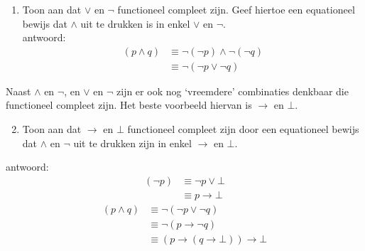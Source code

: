 \begin{answer}\mbox{} %
\begin{enumerate}[label=\textit{\alph*.}]
\item Toon aan dat $\lor$ en $\neg$ functioneel compleet zijn. Geef hiertoe een equationeel bewijs dat $\land$ uit te drukken is in enkel $\lor$ en $\neg$. \\
antwoord:
\begin{align}
  (p\land q) & \equiv \neg (\neg p) \land \neg (\neg q) \tag{tweemaal St-2.3.2: 1}\\
             & \equiv \neg (\neg p \lor \neg q) \tag{St-2.3.2: 9}
\end{align}
\end{enumerate}
Naast $\land$ en $\neg$, en $\lor$ en $\neg$ zijn er ook nog `vreemdere' combinaties denkbaar die functioneel compleet zijn. Het beste voorbeeld hiervan is $\rightarrow$ en $\bot$.
\begin{enumerate}[label=\textit{\alph*.}]
\setcounter{enumi}{1}
\item Toon aan dat $\rightarrow$ en $\bot$ functioneel compleet zijn door een equationeel bewijs dat $\land$ en $\neg$ uit te drukken zijn in enkel $\rightarrow$ en $\bot$.
\end{enumerate}
antwoord:
\begin{align}
  (\neg p) & \equiv \neg p \lor \bot \tag{St-2.3.2: 1}\\
           & \equiv p \to \bot \tag{St-2.3.2: 7}
\end{align}
\begin{align}
  (p\land q) & \equiv \neg (\neg p \lor \neg q) \tag{Opg-2.11: (a)}\\
             & \equiv \neg (p \to \neg q) \tag{St-2.3.2: 7}\\
             & \equiv (p \to (q \to \bot)) \to \bot \tag{Opg-2.11: (b)}
\end{align}



\end{answer}

